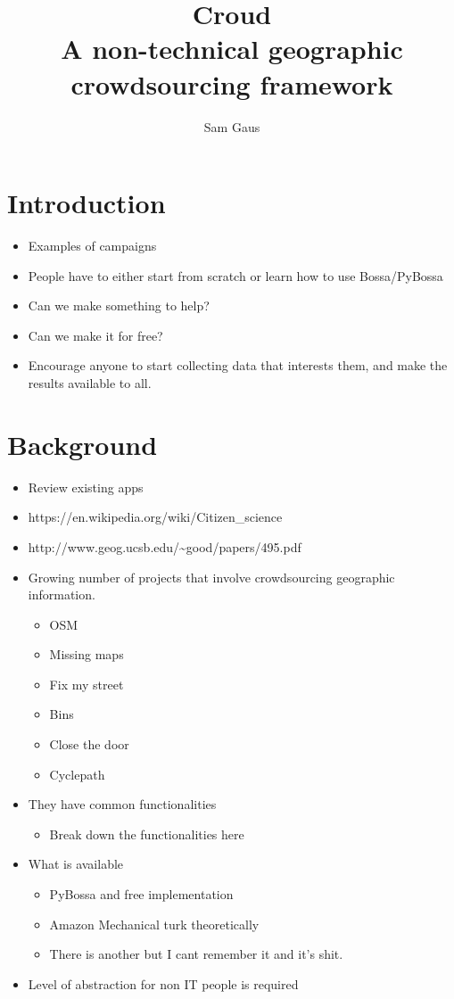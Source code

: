 \documentclass{article}
\begin{document}
	\title{Croud \\ \vspace{2 mm} {\large A non-technical geographic crowdsourcing framework}}
	\author{Sam Gaus}
	\date{}
	\maketitle

	\section{Introduction}
		\begin{itemize}
			\item Examples of campaigns
			\item People have to either start from scratch or learn how to use Bossa/PyBossa
			\item Can we make something to help?
			\item Can we make it for free?
			\item Encourage anyone to start collecting data that interests them, and make the results available to all.
		\end{itemize}

	\section{Background}
		\begin{itemize}
			\item Review existing apps
			\item https://en.wikipedia.org/wiki/Citizen\_science
			\item http://www.geog.ucsb.edu/\~{}good/papers/495.pdf
			\item Growing number of projects that involve crowdsourcing geographic information.
			\begin{itemize}
				\item OSM
				\item Missing maps
				\item Fix my street
				\item Bins
				\item Close the door
				\item Cyclepath
			\end{itemize}
			\item They have common functionalities
			\begin{itemize}
				\item Break down the functionalities here
			\end{itemize}
			\item What is available
			\begin{itemize}
				\item PyBossa and free implementation
				\item Amazon Mechanical turk theoretically
				\item There is another but I cant remember it and it's shit.
			\end{itemize}
			\item Level of abstraction for non IT people is required
		\end{itemize}
\end{document}
